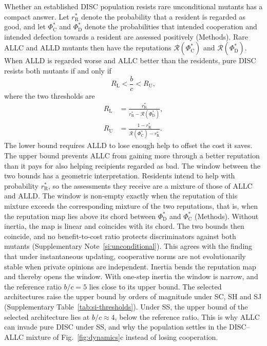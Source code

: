 \documentclass[10pt]{wlscirep}
\newcommand{\Rmap}{\mathscr{R}}            %
\newcommand{\rR}{r_{\mathrm{R}}^{*}}
\newcommand{\PhiCs}{\Phi^{*}_{\mathrm{C}}}
\newcommand{\PhiDs}{\Phi^{*}_{\mathrm{D}}}
\theoremstyle{plain}
\theoremstyle{remark}
\begin{document}
Whether an established DISC population resists rare unconditional mutants has a compact answer. Let $\rR$ denote the probability that a resident is regarded as good, and let $\PhiCs$ and $\PhiDs$ denote the probabilities that intended cooperation and intended defection towards a resident are assessed positively (Methods). Rare ALLC and ALLD mutants then have the reputations $\Rmap(\PhiCs)$ and $\Rmap(\PhiDs)$. When ALLD is regarded worse and ALLC better than the residents, pure DISC resists both mutants if and only if
\begin{equation}
R_{\mathrm L}<\frac{b}{c}<R_{\mathrm U},
\label{eq:window}
\end{equation}
where the two thresholds are
\begin{equation}
\begin{aligned}
R_{\mathrm L}&=\frac{\rR}{\rR-\Rmap(\PhiDs)},\\[4pt]
R_{\mathrm U}&=\frac{1-\rR}{\Rmap(\PhiCs)-\rR}.
\end{aligned}
\label{eq:thresholds}
\end{equation}
The lower bound requires ALLD to lose enough help to offset the cost it saves. The upper bound prevents ALLC from gaining more through a better reputation than it pays for also helping recipients regarded as bad. The window between the two bounds has a geometric interpretation. Residents intend to help with probability $\rR$, so the assessments they receive are a mixture of those of ALLC and ALLD. The window is non-empty exactly when the reputation of this mixture exceeds the corresponding mixture of the two reputations, that is, when the reputation map lies above its chord between $\PhiDs$ and $\PhiCs$ (Methods). Without inertia, the map is linear and coincides with its chord. The two bounds then coincide, and no benefit-to-cost ratio protects discriminators against both mutants (Supplementary Note~\ref{si:unconditional}). This agrees with the finding that under instantaneous updating, cooperative norms are not evolutionarily stable when private opinions are independent\cite{murase2024synchronization}. Inertia bends the reputation map and thereby opens the window. With one-step inertia the window is narrow, and the reference ratio $b/c=5$ lies close to its upper bound. The selected architectures raise the upper bound by orders of magnitude under SC, SH and SJ (Supplementary Table~\ref{tab:si-thresholds}). Under SS, the upper bound of the selected architecture lies at $b/c\approx4$, below the reference ratio. This is why ALLC can invade pure DISC under SS, and why the population settles in the DISC--ALLC mixture of Fig.~\ref{fig:dynamics}c instead of losing cooperation.
\end{document}
